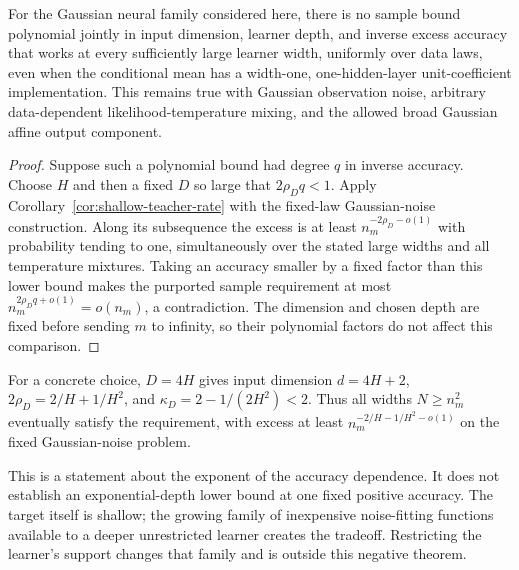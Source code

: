 \begin{corollary}
\label{cor:no-joint-depth-accuracy}
For the Gaussian neural family considered here, there is no sample bound polynomial jointly in input dimension, learner depth, and inverse excess accuracy that works at every sufficiently large learner width, uniformly over data laws, even when the conditional mean has a width-one, one-hidden-layer unit-coefficient implementation. This remains true with Gaussian observation noise, arbitrary data-dependent likelihood-temperature mixing, and the allowed broad Gaussian affine output component.
\end{corollary}
\begin{proof}
Suppose such a polynomial bound had degree $q$ in inverse accuracy. Choose $H$ and then a fixed $D$ so large that $2\rho_Dq<1$. Apply Corollary~\ref{cor:shallow-teacher-rate} with the fixed-law Gaussian-noise construction. Along its subsequence the excess is at least $n_m^{-2\rho_D-o(1)}$ with probability tending to one, simultaneously over the stated large widths and all temperature mixtures. Taking an accuracy smaller by a fixed factor than this lower bound makes the purported sample requirement at most $n_m^{2\rho_Dq+o(1)}=o(n_m)$, a contradiction. The dimension and chosen depth are fixed before sending $m$ to infinity, so their polynomial factors do not affect this comparison.
\end{proof}

For a concrete choice, $D=4H$ gives input dimension $d=4H+2$, $2\rho_D=2/H+1/H^2$, and $\kappa_D=2-1/(2H^2)<2$. Thus all widths $N\ge n_m^2$ eventually satisfy the requirement, with excess at least $n_m^{-2/H-1/H^2-o(1)}$ on the fixed Gaussian-noise problem.

This is a statement about the exponent of the accuracy dependence. It does not establish an exponential-depth lower bound at one fixed positive accuracy. The target itself is shallow; the growing family of inexpensive noise-fitting functions available to a deeper unrestricted learner creates the tradeoff. Restricting the learner's support changes that family and is outside this negative theorem.

